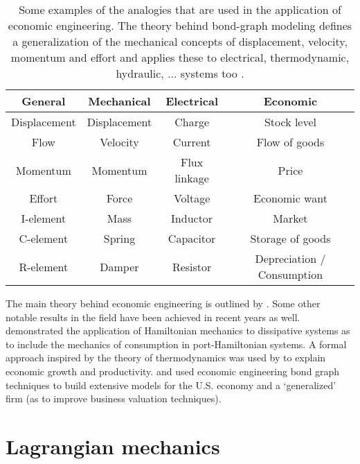 \begin{table}[h]
    \centering
    \caption{Some examples of the analogies that are used in the application of economic engineering. The theory behind bond-graph modeling defines a generalization of the mechanical concepts of displacement, velocity, momentum and effort and applies these to electrical, thermodynamic, hydraulic, ... systems too \cite{Karnopp2012}.}
    \label{tab:analogies}
    \begin{tabular}{cccc}
        \toprule
        \textbf{General} & \textbf{Mechanical} & \textbf{Electrical} & \textbf{Economic} \\ 
        \midrule
        Displacement & Displacement & Charge & Stock level\\
        Flow & Velocity & Current & Flow of goods \\
        Momentum & Momentum & Flux linkage & Price \\
        Effort & Force & Voltage & Economic want \\
        \midrule
        I-element & Mass & Inductor & Market \\
        C-element & Spring & Capacitor & Storage of goods \\
        R-element & Damper & Resistor & Depreciation / Consumption \\
        \bottomrule
    \end{tabular}
\end{table}
The main theory behind economic engineering is outlined by \citet{Mendel2019}. Some other notable results in the field have been achieved in recent years as well. \citet{Hutters2020b} demonstrated the application of Hamiltonian mechanics to dissipative systems as to include the mechanics of consumption in port-Hamiltonian systems. A formal approach inspired by the theory of thermodynamics was used by \citet{Manders2019} to explain economic growth and productivity. \citet{Kruimer2021} and \citet{VanArdenne2020} used economic engineering bond graph techniques to build extensive models for the U.S. economy and a `generalized' firm (as to improve business valuation techniques).

\section{Lagrangian mechanics}
